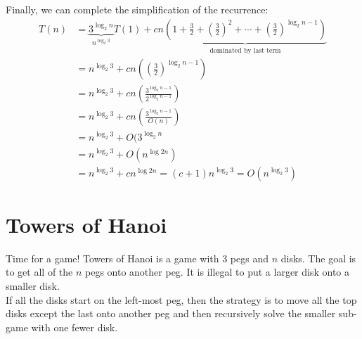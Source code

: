 \documentclass[14pt]{extarticle}
\begin{document}
    Finally, we can complete the simplification of the recurrence:
    \begin{align*}
        T(n) &= \underbrace{3^{\log_2 n}}_{n^{\log_2 3}}T(1) +  
            cn\underbrace{\left(1 + \frac{3}{2} 
            + \left(\frac{3}{2}\right)^2 
            + \cdots
            + \left(\frac{3}{2}\right)^{\log_2 n - 1}
        \right)}_{\text{dominated by last term}}                \\
             &= n^{\log_2 3} + cn\left(
                 \left(\frac{3}{2}\right)^{\log_2 n - 1}
             \right)                                            \\
             &= n^{\log_2 3} + cn\left(
                 \frac{3^{\log_2 n - 1}}{2^{\log_2 n - 1}}
             \right)                                            \\
             &= n^{\log_2 3} + cn\left(
                 \frac{3^{\log_2 n - 1}}{O(n)}
             \right)                                            \\
             &= n^{\log_2 3} + O(3^{\log_2 n}                   \\
             &= n^{\log_2 3} + O(n^{\log 2 n})                  \\
             &= n^{\log_2 3} + cn^{\log 2 n}                
              = (c+1)n^{\log_2 3}                               
              = \boxed{O(n^{\log_2 3})}
    \end{align*}

    \section{Towers of Hanoi}
    Time for a game! Towers of Hanoi is a game with 3 pegs and $n$
    disks. The goal is to get all of the $n$ pegs onto another peg.
    It is illegal to put a larger disk onto a smaller disk.\\

    If all the disks start on the left-most peg, then the strategy is
    to move all the top disks except the last onto another peg and then
    recursively solve the smaller sub-game with one fewer disk.\\
\end{document}
